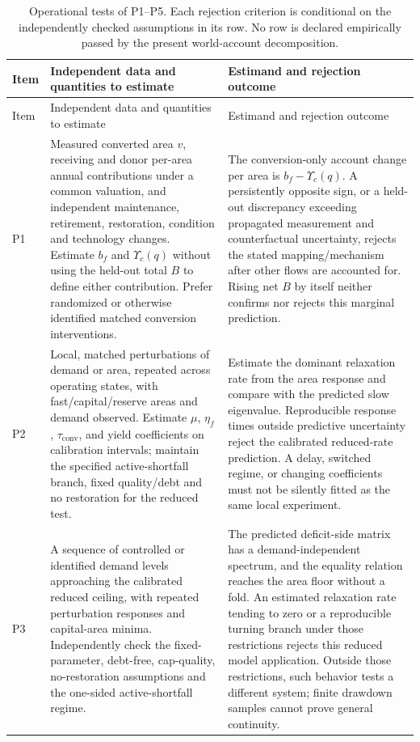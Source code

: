 \documentclass[11pt,a4paper]{article}
\newcommand{\Ups}{\Upsilon_c}
\begin{document}
\begin{longtable}{>{\raggedright\arraybackslash}p{}>{\raggedright\arraybackslash}p{}>{\raggedright\arraybackslash}p{}}
\caption{Operational tests of P1--P5. Each rejection criterion is conditional on the independently checked assumptions in its row. No row is declared empirically passed by the present world-account decomposition.}\label{tab:si_predictionmap}\\
\toprule
Item & Independent data and quantities to estimate & Estimand and rejection outcome \\
\midrule
\endfirsthead
\toprule Item & Independent data and quantities to estimate & Estimand and rejection outcome \\
\midrule
\endhead
P1 & Measured converted area $v$, receiving and donor per-area annual contributions under a common valuation, and independent maintenance, retirement, restoration, condition and technology changes. Estimate $b_f$ and $\Ups(q)$ without using the held-out total $B$ to define either contribution. Prefer randomized or otherwise identified matched conversion interventions. & The conversion-only account change per area is $b_f-\Ups(q)$. A persistently opposite sign, or a held-out discrepancy exceeding propagated measurement and counterfactual uncertainty, rejects the stated mapping/mechanism after other flows are accounted for. Rising net $B$ by itself neither confirms nor rejects this marginal prediction. \\
\addlinespace
P2 & Local, matched perturbations of demand or area, repeated across operating states, with fast/capital/reserve areas and demand observed. Estimate $\mu$, $\eta_f$, $\tau_{\mathrm{conv}}$, and yield coefficients on calibration intervals; maintain the specified active-shortfall branch, fixed quality/debt and no restoration for the reduced test. & Estimate the dominant relaxation rate from the area response and compare with the predicted slow eigenvalue. Reproducible response times outside predictive uncertainty reject the calibrated reduced-rate prediction. A delay, switched regime, or changing coefficients must not be silently fitted as the same local experiment. \\
\addlinespace
P3 & A sequence of controlled or identified demand levels approaching the calibrated reduced ceiling, with repeated perturbation responses and capital-area minima. Independently check the fixed-parameter, debt-free, cap-quality, no-restoration assumptions and the one-sided active-shortfall regime. & The predicted deficit-side matrix has a demand-independent spectrum, and the equality relation reaches the area floor without a fold. An estimated relaxation rate tending to zero or a reproducible turning branch under those restrictions rejects this reduced model application. Outside those restrictions, such behavior tests a different system; finite drawdown samples cannot prove general continuity. \\

\end{longtable}
\end{document}
